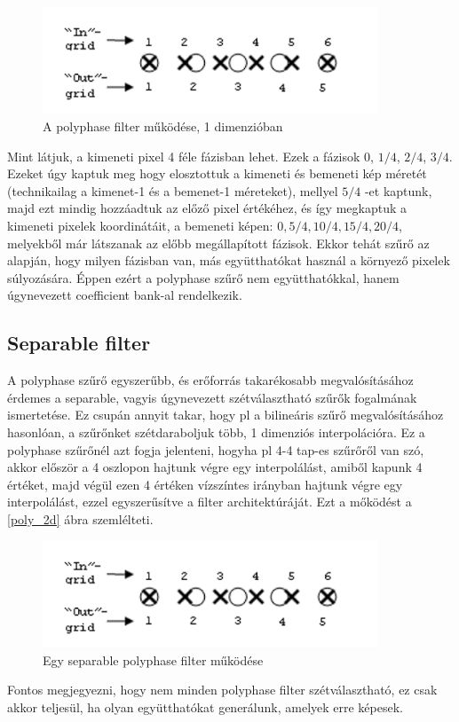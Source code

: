 \begin{figure}[!ht]
	\centering
	\includegraphics[width=100mm, keepaspectratio]{figures/poly_1d.png}
	\caption{A polyphase filter működése, 1 dimenzióban \cite{Xilinx_poly}} 
	\label{pic:poly_1d}
\end{figure}

Mint látjuk, a kimeneti pixel 4 féle fázisban lehet. Ezek a fázisok $0$, $1/4$, $2/4$, $3/4$. Ezeket úgy kaptuk meg hogy elosztottuk a kimeneti és bemeneti kép méretét (technikailag a kimenet-1 és a bemenet-1 méreteket), mellyel $5/4$ -et kaptunk, majd ezt mindig hozzáadtuk az előző pixel értékéhez, és így megkaptuk a kimeneti pixelek koordinátáit, a bemeneti képen: $0, 5/4, 10/4, 15/4, 20/4$, melyekből már látszanak az előbb megállapított fázisok. Ekkor tehát szűrő az alapján, hogy milyen fázisban van, más együtthatókat használ a környező pixelek súlyozására. Éppen ezért a polyphase szűrő nem együtthatókkal, hanem úgynevezett coefficient bank-al rendelkezik.

\subsection{Separable filter}

A polyphase szűrő egyszerűbb, és erőforrás takarékosabb megvalósításához érdemes a separable, vagyis úgynevezett szétválasztható szűrők fogalmának ismertetése. Ez csupán annyit takar, hogy pl a bilineáris szűrő megvalósításához hasonlóan, a szűrőnket szétdaraboljuk több, 1 dimenziós interpolációra. Ez a polyphase szűrőnél azt fogja jelenteni, hogyha pl 4-4 tap-es szűrőről van szó, akkor először a 4 oszlopon hajtunk végre egy interpolálást, amiből kapunk 4 értéket, majd végül ezen 4 értéken vízszíntes irányban hajtunk végre egy interpolálást, ezzel egyszerűsítve a filter architektúráját.\cite{Bart Wronski_2020} Ezt a mőködést a \ref{poly_2d} ábra szemlélteti.

\begin{figure}[!ht]
	\centering
	\includegraphics[width=100mm, keepaspectratio]{figures/poly_1d.png}
	\caption{Egy separable polyphase filter működése} 
	\label{pic:poly_2d}
\end{figure}

Fontos megjegyezni, hogy nem minden polyphase filter szétválasztható, ez csak akkor teljesül, ha olyan együtthatókat generálunk, amelyek erre képesek.

